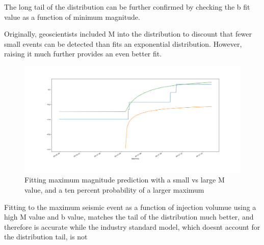 \documentclass{article}
\begin{document}
    The long tail of the distribution can be further confirmed by checking the b fit value as a function of minimum magnitude.
    
    Originally, geoscientists included M into the distribution to discount that fewer small events can be detected than fits an exponential distribution. 
    However, raising it much further provides an even better fit.
    \begin{figure}[H]
    \centering
    \includegraphics*[width = \textwidth, height = \textheight, keepaspectratio]{fantasticFit.png}
    \caption{Fitting maximum magnitude prediction with a small vs large M value, and a ten percent probability of a larger maximum}
    \end{figure}
    Fitting to the maximum seismic event as a function of injection volumue  using a high M value and b value, matches the tail of the distribution 
    much better, and therefore is accurate while the industry standard model, which doesnt account for the distribution tail,  is not
\end{document}
